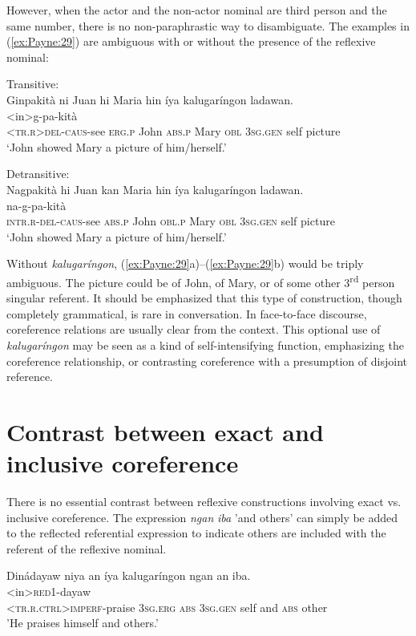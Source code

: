 \documentclass[output=paper]{langscibook}
\begin{document}
However, when the actor and the non-actor nominal are third person and the same number, there is no non-paraphrastic way to disambiguate. The examples in (\ref{ex:Payne:29}) are ambiguous with or without the presence of the reflexive nominal:

\ea
\label{ex:Payne:29}
\ea
Transitive:\\
\glll
 Ginpakità ni Juan hi Maria hin íya kalugaríngon ladawan.\\
 <in>g-pa-kità\\
 \textsc{<tr.r>del-caus}-see \textsc{erg.p} John \textsc{abs.p} Mary \textsc{obl} 3\textsc{sg.gen} self picture\\
 \glt ‘John showed Mary a picture of him/herself.'
 
\ex
Detransitive:\\
\glll
Nagpakità hi Juan kan Maria hin íya kalugaríngon ladawan.\\
na-g-pa-kità \\
\textsc{intr.r-del-caus}-see \textsc{abs.p} John \textsc{obl.p} Mary \textsc{obl} 3\textsc{sg.gen} self picture\\
\glt ‘John showed Mary a picture of him/herself.'
\z
\z

Without \textit{kalugaríngon}, (\ref{ex:Payne:29}a)--(\ref{ex:Payne:29}b) would be triply ambiguous. The picture could be of John, of Mary, or of some other 3\textsuperscript{rd} person singular referent. It should be emphasized that this type of construction, though completely grammatical, is rare in conversation. In face-to-face discourse, coreference relations are usually clear from the context. This optional use of \textit{kalugaríngon} may be seen as a kind of self-intensifying function, emphasizing the coreference relationship, or contrasting coreference with a presumption of disjoint reference. 

\section{Contrast between exact and inclusive coreference} 
\label{sec:Payne:7}

There is no essential contrast between reflexive constructions involving exact vs. inclusive coreference. The expression \textit{ngan} \textit{iba} 'and others' can simply be added to the reflected referential expression to indicate others are included with the referent of the reflexive nominal.

\ea
\label{ex:Payne:30}
\glll
 Dinádayaw niya an íya kalugaríngon ngan an iba.\\
 <in>\textsc{red}1-dayaw \\
 <\textsc{tr.r.ctrl}>\textsc{imperf}-praise 3\textsc{sg.erg} \textsc{abs} 3\textsc{sg.gen} self and \textsc{abs} other\\
 \glt'He praises himself and others.'
\z
\end{document}
